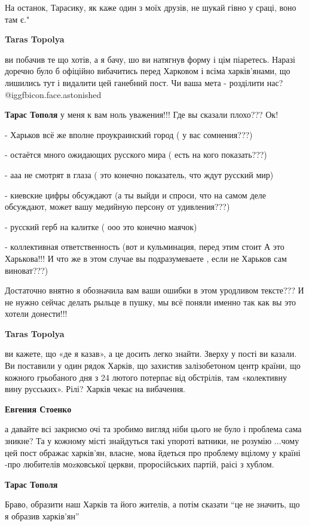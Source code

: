 \begin{itemize}
\begin{itemize}
На останок, Тарасику, як каже один з моїх друзів, не шукай гівно у сраці, воно
там є."

\textbf{Taras Topolya} 

ви побачив те що хотів, а я бачу, шо ви натягнув форму і цім піаретесь. Наразі
доречно було б офіційно вибачитись перед Харковом і всіма харків'янами, що
лишились тут і видалити цей ганебний пост. Чи ваша мета - розділити нас?  @igg{fbicon.face.astonished} 

\textbf{Тарас Тополя} у меня к вам ноль уважения!!! Где вы сказали плохо??? Ок!

- Харьков всё же вполне проукраинский город ( у вас сомнения???)

- остаётся много ожидающих русского мира ( есть на кого показать???)

- ааа не смотрят в глаза ( это конечно показатель, что ждут русский мир)

- киевские цифры обсуждают (а ты выйди и спроси, что на самом деле обсуждают,
может вашу медийную персону от удивления???)

- русский герб на калитке ( ооо это конечно маячок)

- коллективная ответственность (вот и кульминация, перед этим стоит А это
Харькова!!! И что же в этом случае вы подразумеваете , если не Харьков сам
виноват???)

Достаточно внятно я обозначила вам ваши ошибки в этом уродливом тексте??? И не
нужно сейчас делать рыльце в пушку, мы всё поняли именно так как вы это хотели
донести!!!

\textbf{Taras Topolya} 

ви кажете, що «де я казав», а це досить легко знайти. Зверху у пості ви казали.
Ви поставили у один рядок Харків, що захистив залізобетоном центр країни, що
кожного грьобаного дня з 24 лютого потерпає від обстрілів, там «колективну вину
русських». Рілі? Харків чекає на вибачення.

\textbf{Евгения Стоенко} 

а давайте всі закриємо очі та зробимо вигляд ніби цього не було і проблема сама
зникне? Та у кожному місті знайдуться такі упороті ватники, не розумію ...чому цей
пост ображає харків'ян, власне, мова йдеться про проблему вцілому у країні -про
любителів моzковської церкви, проросійських партій, раісі з хублом.

\textbf{Тарас Тополя}

Браво, образити наш Харків та його жителів, а потім сказати \enquote{це не
значить, що я образив харків'ян}


\end{itemize}
\end{itemize}
